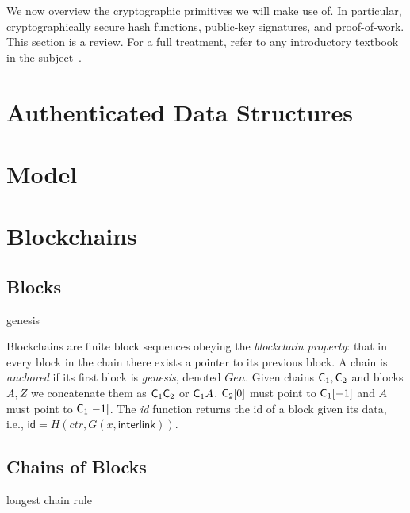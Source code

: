 We now overview the cryptographic primitives we will make use of. In particular,
cryptographically secure hash functions, public-key signatures, and
proof-of-work. This section is a review. For a full
treatment, refer to any introductory textbook in the subject~\cite{katz,handbook,foundations1,foundations2}.




\section{Authenticated Data Structures}


\section{Model}






\section{Blockchains}



\subsection{Blocks}
genesis


Blockchains are finite
block sequences obeying the \emph{blockchain property}: that in every block in
the chain there exists a pointer to its previous block. A chain is
\emph{anchored} if its first block is \emph{genesis}, denoted $Gen$.
Given chains $\mathsf{C}_1, \mathsf{C}_2$ and blocks $A, Z$ we concatenate them as
$\mathsf{C}_1 \mathsf{C}_2$ or $\mathsf{C}_1 A$. $\mathsf{C}_2[0]$ must point to $\mathsf{C}_1[-1]$
and $A$ must point to $\mathsf{C}_1[-1]$.
The \emph{id} function
returns the id of a block given its data, i.e., $\textsf{id} = H(ctr, G(x,
\textsf{interlink}))$.

\subsection{Chains of Blocks}
longest chain rule
